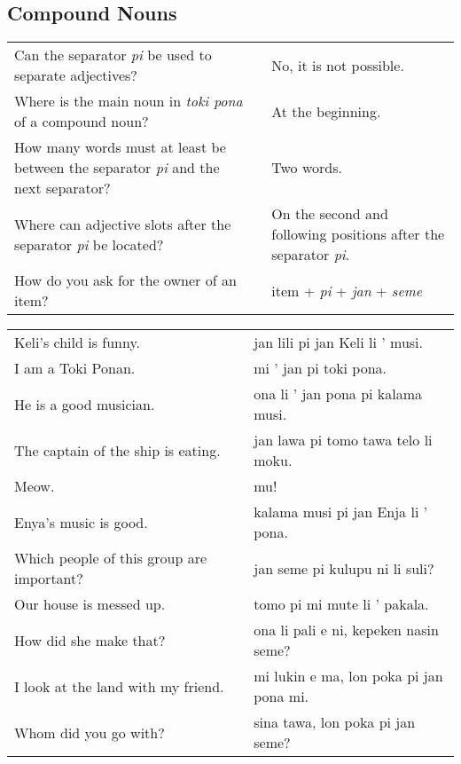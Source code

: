 \newpage

\subsection*{Compound Nouns}
\label{'pi'}

\begin{supertabular}{p{5,5cm}|ll}
    Can the separator \textit{pi} be used to separate adjectives?                             &  & No, it is not possible.                                                \\
    Where is the main noun in \textit{toki pona} of a compound noun?                          &  & At the beginning.                                                      \\
    How many words must at least be between the separator \textit{pi} and the next separator? &  & Two words.                                                             \\
    Where can adjective slots after the separator \textit{pi} be located?                     &  & On the second and following positions after the separator \textit{pi}. \\
    How do you ask for the owner of an item?                                                  &  & item + \textit{pi} + \textit{jan} + \textit{seme}                      \\
\end{supertabular}

\begin{supertabular}{p{5,5cm}|ll}
    Keli's child is funny.                    &  & jan lili pi jan Keli li ' musi.         \\
    I am a Toki Ponan.                        &  & mi ' jan pi toki pona.                  \\
    He is a good musician.                    &  & ona li ' jan pona pi kalama musi.       \\
    The captain of the ship is eating.        &  & jan lawa pi tomo tawa telo li moku.     \\
    Meow.                                     &  & mu!                                     \\
    Enya's music is good.                     &  & kalama musi pi jan Enja li ' pona.      \\
    Which people of this group are important? &  & jan seme pi kulupu ni li suli?          \\
    Our house is messed up.                   &  & tomo pi mi mute li ' pakala.            \\
    How did she make that?                    &  & ona li pali e ni, kepeken nasin seme?   \\
    I look at the land with my friend.        &  & mi lukin e ma, lon poka pi jan pona mi. \\
    Whom did you go with?                     &  & sina tawa, lon poka pi jan seme?        \\
\end{supertabular}

